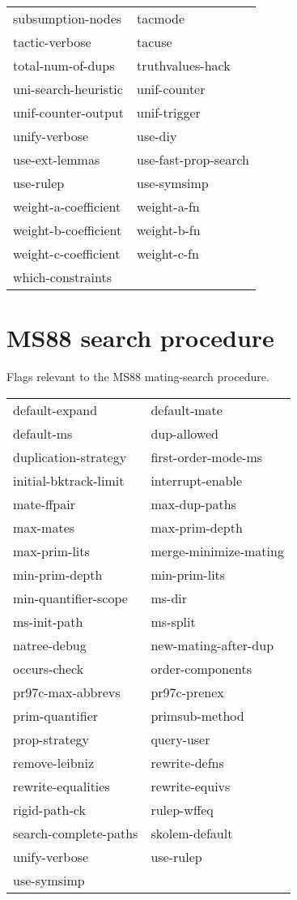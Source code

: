 \begin{description}
\begin{tabular}{l l}
subsumption-nodes&tacmode\\
tactic-verbose&tacuse\\
total-num-of-dups&truthvalues-hack\\
uni-search-heuristic&unif-counter\\
unif-counter-output&unif-trigger\\
unify-verbose&use-diy\\
use-ext-lemmas&use-fast-prop-search\\
use-rulep&use-symsimp\\
weight-a-coefficient&weight-a-fn\\
weight-b-coefficient&weight-b-fn\\
weight-c-coefficient&weight-c-fn\\
which-constraints
\end{tabular}
\item
\end{description}

\section{MS88 search procedure}

\begin{description} 
\item[MS88]  
Flags relevant to the MS88 mating-search procedure.

\begin{tabular}{l l}
default-expand&default-mate\\
default-ms&dup-allowed\\
duplication-strategy&first-order-mode-ms\\
initial-bktrack-limit&interrupt-enable\\
mate-ffpair&max-dup-paths\\
max-mates&max-prim-depth\\
max-prim-lits&merge-minimize-mating\\
min-prim-depth&min-prim-lits\\
min-quantifier-scope&ms-dir\\
ms-init-path&ms-split\\
natree-debug&new-mating-after-dup\\
occurs-check&order-components\\
pr97c-max-abbrevs&pr97c-prenex\\
prim-quantifier&primsub-method\\
prop-strategy&query-user\\
remove-leibniz&rewrite-defns\\
rewrite-equalities&rewrite-equivs\\
rigid-path-ck&rulep-wffeq\\
search-complete-paths&skolem-default\\
unify-verbose&use-rulep\\
use-symsimp
\end{tabular}
\item
\end{description}

